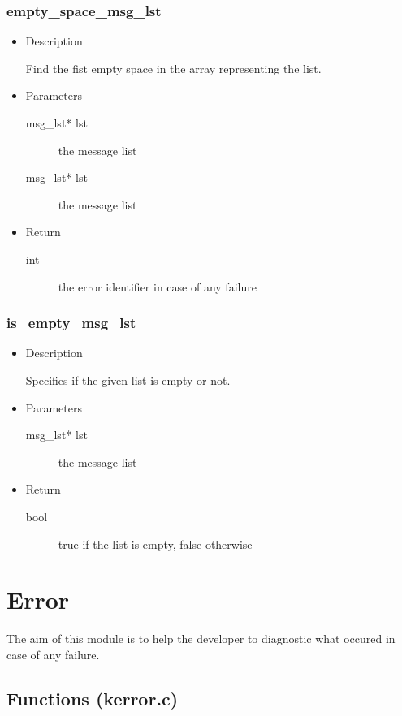 \subsubsection{empty\_space\_msg\_lst}
\begin{itemize}
\item{Description}

	Find the fist empty space in the array representing the list.
\item{Parameters}
	\begin{description}
	\item[msg\_lst* lst] the message list
	\item[msg\_lst* lst] the message list
	\end{description}
\item{Return}
	\begin{description}
	\item[int] the error identifier in case of any failure
	\end{description}
\end{itemize}


\subsubsection{is\_empty\_msg\_lst}
\begin{itemize}
\item{Description}

	Specifies if the given list is empty or not.
\item{Parameters}
	\begin{description}
	\item[msg\_lst* lst] the message list
	\end{description}
\item{Return}
	\begin{description}
	\item[bool] true if the list is empty, false otherwise
	\end{description}
\end{itemize}


\section{Error}

The aim of this module is to help the developer to diagnostic what occured in
case of any failure.
\subsection{Functions (kerror.c)}

